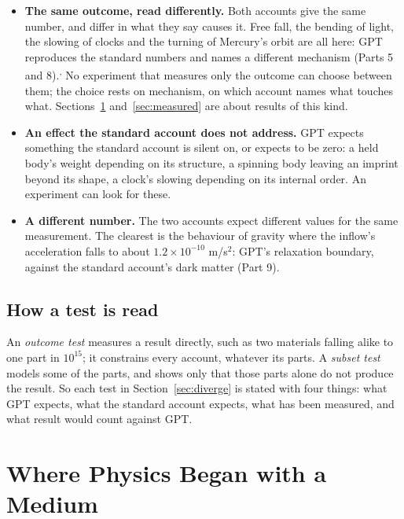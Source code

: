 \begin{itemize}
\item \textbf{The same outcome, read differently.} Both accounts give the same number, and differ in what they say causes it. Free fall, the bending of light, the slowing of clocks and the turning of Mercury's orbit are all here: GPT reproduces the standard numbers and names a different mechanism (Parts 5 and 8).\textsuperscript{,} No experiment that measures only the outcome can choose between them; the choice rests on mechanism, on which account names what touches what. Sections~\ref{sec:history} and~\ref{sec:measured} are about results of this kind.
\item \textbf{An effect the standard account does not address.} GPT expects something the standard account is silent on, or expects to be zero: a held body's weight depending on its structure, a spinning body leaving an imprint beyond its shape, a clock's slowing depending on its internal order. An experiment can look for these.
\item \textbf{A different number.} The two accounts expect different values for the same measurement. The clearest is the behaviour of gravity where the inflow's acceleration falls to about $1.2\times10^{-10}$ m/s$^2$: GPT's relaxation boundary, against the standard account's dark matter (Part 9).
\end{itemize}

\subsection{How a test is read}

 An \emph{outcome test} measures a result directly, such as two materials falling alike to one part in $10^{15}$; it constrains every account, whatever its parts. A \emph{subset test} models some of the parts, and shows only that those parts alone do not produce the result. So each test in Section~\ref{sec:diverge} is stated with four things: what GPT expects, what the standard account expects, what has been measured, and what result would count against GPT.

\section{Where Physics Began with a Medium}\label{sec:history}

